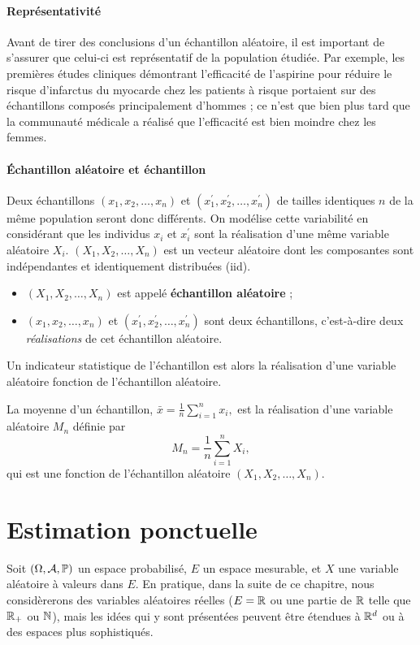 \paragraph{Représentativité} Avant de tirer des conclusions d'un échantillon
aléatoire, il est important de s'assurer que celui-ci est représentatif de la
population étudiée. Par exemple, les premières études cliniques démontrant
l'efficacité de l'aspirine pour réduire le risque d'infarctus du myocarde chez
les patients à risque portaient sur des échantillons composés principalement
d'hommes ; ce n'est que bien plus tard que la communauté médicale a réalisé que
l'efficacité est bien moindre chez les femmes.

\paragraph{Échantillon aléatoire et échantillon} Deux échantillons $(x_1, x_2, \dots, x_n)$ et
$(x^\prime_1, x^\prime_2, \dots, x^\prime_n)$ de tailles identiques $n$ de la
même population seront donc différents. On modélise cette variabilité en
considérant que les individus $x_i$ et $x^\prime_i$ sont la réalisation
d'une même variable aléatoire $X_i.$ $(X_1, X_2, \dots, X_n)$ est un vecteur
aléatoire dont les composantes sont indépendantes et identiquement
distribuées (iid).
\begin{itemize}
\item $(X_1, X_2, \dots, X_n)$ est appelé \textbf{échantillon aléatoire} ;
\item $(x_1, x_2, \dots, x_n)$ et $(x^\prime_1, x^\prime_2, \dots, x^\prime_n)$
  sont deux échantillons, c'est-à-dire deux \textit{réalisations} de cet
  échantillon aléatoire.
\end{itemize}

Un indicateur statistique de l'échantillon est alors la réalisation d'une
variable aléatoire fonction de l'échantillon aléatoire.

\begin{exemple} La moyenne d'un échantillon,
$\bar{x} = \frac1n \sum_{i=1}^n x_i,$ est la réalisation d'une variable
aléatoire $M_n$ définie par
\[
  M_n = \frac1n \sum_{i=1}^n X_i,
\]
qui est une fonction de l'échantillon aléatoire $(X_1, X_2, \dots, X_n)$.
\end{exemple}

\section{Estimation ponctuelle}
Soit $(\Omega, \mathcal{A}, \mathbb{P})$ un espace probabilisé, $E$ un espace mesurable, et
$X$ une variable aléatoire à valeurs dans $E$. En pratique, dans la suite de ce
chapitre, nous considèrerons des variables aléatoires réelles ($E = \mathbb{R}$ ou une
partie de $\mathbb{R}$ telle que $\mathbb{R}_+$ ou $\mathbb{N}$), mais les idées qui y sont
présentées peuvent être étendues à $\mathbb{R}^d$ ou à des espaces plus sophistiqués.

